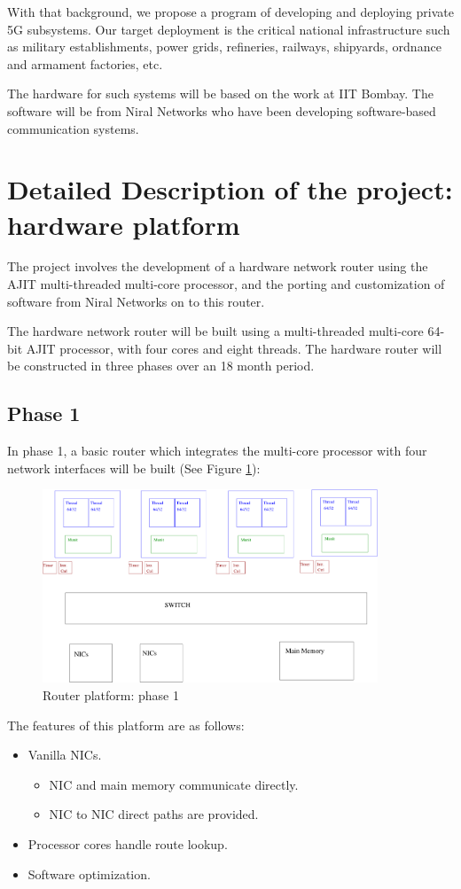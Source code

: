 \documentclass{article}
\begin{document}
	With that background, we propose a program of developing and deploying  private 5G subsystems.
	Our target deployment is the critical national infrastructure such as military establishments, 
	power grids, refineries, railways, shipyards, ordnance and armament factories, etc. 

	The hardware for such systems will be based on the work at IIT Bombay. The software will be from 
	Niral Networks who have been developing software-based communication systems.


\section{Detailed Description of the project: hardware platform}

	The project involves the development of a hardware network router using the
	AJIT multi-threaded multi-core processor, and the porting and customization of
	software from Niral Networks on to this router. 

	The hardware network router will be built using a multi-threaded multi-core
	64-bit AJIT processor, with four cores and eight threads.  The hardware
	router will be constructed in three phases over an 18 month period.

\subsection{Phase 1}

	In phase 1, a basic router which integrates the multi-core processor with
	four network interfaces will be built (See Figure \ref{fig:Phase1}):

\begin{figure}
  \centering
  \includegraphics[width=10cm]{figs/Router_I.pdf}
  \caption{Router platform: phase 1}
  \label{fig:Phase1}
\end{figure}

The features of this platform are as follows:
\begin{itemize}
\item Vanilla NICs.
\begin{itemize}
\item NIC and main memory communicate directly.
\item NIC to NIC direct paths are provided.
\end{itemize}
\item Processor cores handle route lookup.
\item Software optimization.
\end{itemize}
\end{document}
